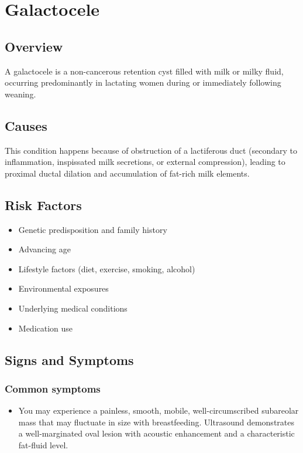 \chapter{Galactocele}
\label{sec:Galactocele}

\section{Overview}
A galactocele is a non-cancerous retention cyst filled with milk or milky fluid, occurring predominantly in lactating women during or immediately following weaning.
\section{Causes}
This condition happens because of obstruction of a lactiferous duct (secondary to inflammation, inspissated milk secretions, or external compression), leading to proximal ductal dilation and accumulation of fat-rich milk elements.     
\section{Risk Factors}

\begin{itemize}[noitemsep]
  \item Genetic predisposition and family history
  \item Advancing age
  \item Lifestyle factors (diet, exercise, smoking, alcohol)
  \item Environmental exposures
  \item Underlying medical conditions
  \item Medication use
\end{itemize}
\section{Signs and Symptoms}

\subsection{Common symptoms}
\begin{itemize}[noitemsep]
  \item You may experience a painless, smooth, mobile, well-circumscribed subareolar mass that may fluctuate in size with breastfeeding. Ultrasound demonstrates a well-marginated oval lesion with acoustic enhancement and a characteristic fat-fluid level. 
  \end{itemize}

